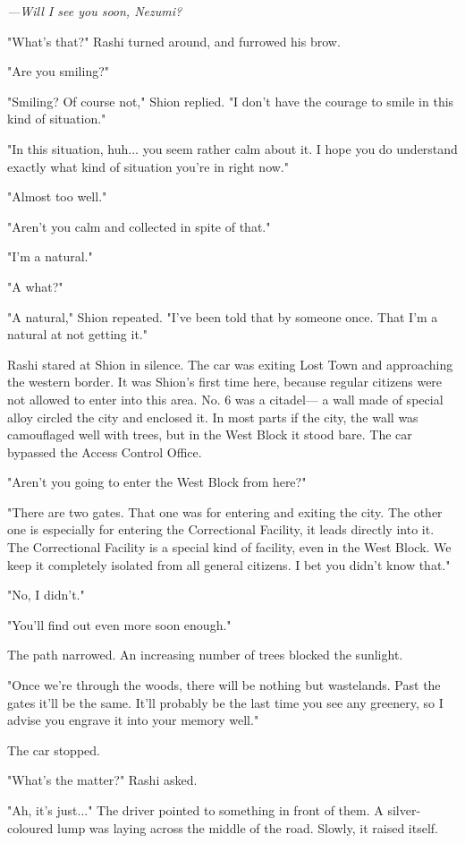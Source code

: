 \emph{---Will I see you soon, Nezumi?}

"What's that?" Rashi turned around, and furrowed his brow.

"Are you smiling?"

"Smiling? Of course not," Shion replied. "I don't have the courage to
smile in this kind of situation."

"In this situation, huh... you seem rather calm about it. I hope you do
understand exactly what kind of situation you're in right now."

"Almost too well."

"Aren't you calm and collected in spite of that."

"I'm a natural."

"A what?"

"A natural," Shion repeated. "I've been told that by someone once. That
I'm a natural at not getting it."

Rashi stared at Shion in silence. The car was exiting Lost Town and
approaching the western border. It was Shion's first time here, because
regular citizens were not allowed to enter into this area. No. 6 was a
citadel--- a wall made of special alloy circled the city and enclosed it.
In most parts if the city, the wall was camouflaged well with trees, but
in the West Block it stood bare. The car bypassed the Access Control
Office.

"Aren't you going to enter the West Block from here?"

"There are two gates. That one was for entering and exiting the city.
The other one is especially for entering the Correctional Facility, it
leads directly into it. The Correctional Facility is a special kind of
facility, even in the West Block. We keep it completely isolated from
all general citizens. I bet you didn't know that."

"No, I didn't."

"You'll find out even more soon enough."

The path narrowed. An increasing number of trees blocked the sunlight.

"Once we're through the woods, there will be nothing but wastelands.
Past the gates it'll be the same. It'll probably be the last time you
see any greenery, so I advise you engrave it into your memory well."

The car stopped.

"What's the matter?" Rashi asked.

"Ah, it's just..." The driver pointed to something in front of them. A
silver-coloured lump was laying across the middle of the road. Slowly,
it raised itself.

